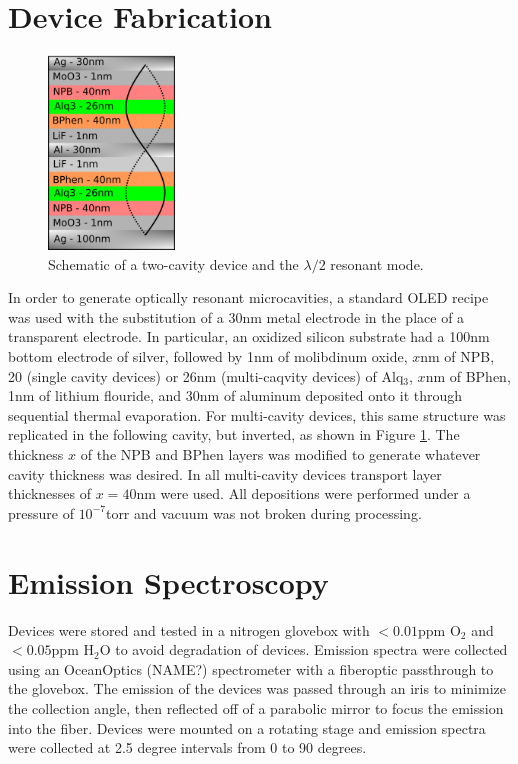 \documentclass{report}
\begin{document}
    \section{Device Fabrication} \label{fab}
    \begin{figure}
        \centering
        \includegraphics[width=0.3\textwidth]{images/schematic.png}
        \caption{\small Schematic of a two-cavity device and the $\lambda/2$ resonant mode.}
        \label{fig:schematic}
    \end{figure}
    In order to generate optically resonant microcavities, a standard OLED recipe\cite{Cai2011,Matsushima2008} was used with the substitution of a 30nm metal electrode in the place of a transparent electrode. In particular, an oxidized silicon substrate had a 100nm bottom electrode of silver, followed by 1nm of molibdinum oxide, $x$nm of NPB, 20 (single cavity devices) or 26nm (multi-caqvity devices) of Alq$_3$, $x$nm of BPhen, 1nm of lithium flouride, and 30nm of aluminum deposited onto it through sequential thermal evaporation. For multi-cavity devices, this same structure was replicated in the following cavity, but inverted, as shown in Figure \ref{fig:schematic}. The thickness $x$ of the NPB and BPhen layers was modified to generate whatever cavity thickness was desired. In all multi-cavity devices transport layer thicknesses of $x=40$nm were used. All depositions were performed under a pressure of $10^{-7}$torr and vacuum was not broken during processing.

    \section{Emission Spectroscopy} \label{spect}
    Devices were stored and tested in a nitrogen glovebox with $<0.01$ppm O$_2$ and $<0.05$ppm H$_2$O to avoid degradation of devices. Emission spectra were collected using an OceanOptics (NAME?) spectrometer with a fiberoptic passthrough to the glovebox. The emission of the devices was passed through an iris to minimize the collection angle, then reflected off of a parabolic mirror to focus the emission into the fiber. Devices were mounted on a rotating stage and emission spectra were collected at 2.5 degree intervals from 0 to 90 degrees.
\end{document}
